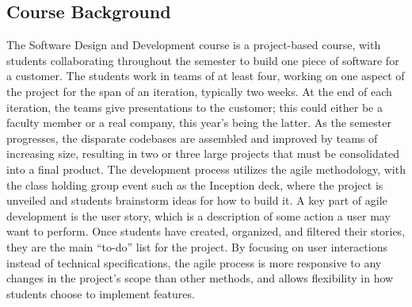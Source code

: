 \documentclass[12pt]{article}
\newcommand{\comment}[1]{{\bf \tt  {#1}}}
\newcommand{\emcomment}[1]{\textcolor{ForestGreen}{\comment{Elena: {#1}}}}
\newcommand{\mmcomment}[1]{\textcolor{MaxBlue}{\comment{Max: {#1}}}}
\begin{document}
\subsection{Course Background}\label{sec:course_background}
 The Software Design and Development course is a project-based course, with students collaborating throughout the semester to build one piece of software for a customer. The students work in teams of at least four, working on one aspect of the project for the span of an iteration, typically two weeks. At the end of each iteration, the teams give presentations to the customer; this could either be a faculty member or a real company, this year's being the latter. As the semester progresses, the disparate codebases are assembled and improved by teams of increasing size, resulting in two or three large projects that must be consolidated into a final product. The development process utilizes the agile methodology, with the class holding group event such as the Inception deck, where the project is unveiled and students brainstorm ideas for how to build it. A key part of agile development is the user story, which is a description of some action a user may want to perform. Once students have created, organized, and filtered their stories, they are the main ``to-do'' list for the project. By focusing on user interactions instead of technical specifications, the agile process is more responsive to any changes in the project's scope than other methods, and allows flexibility in how students choose to implement features.
\end{document}
